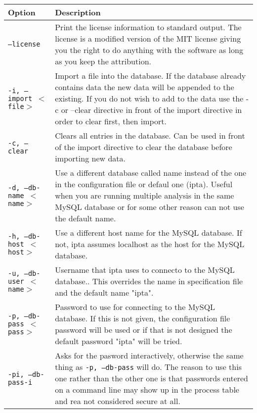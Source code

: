 \documentclass[english,twoside,openright,a4paper,12pt]{article}
\begin{document}
\begin{longtable}{|p{}|p{}|}
\hline
\textbf{Option}& \textbf{Description}\\\hline

\texttt{--license} & Print the license information to standard output. The license is a modified version of the MIT license giving you the right to do anything with the software as long as you keep the attribution.\\ \hline

\texttt{-i, --import $<$file$>$} & Import a file into the database. If the database already contains data the new data will be appended to the existing. If you do not wish to add to the data use the -c or --clear directive in front of the import directive in order to clear first, then import.\\\hline

\texttt{-c, --clear} & Clears all entries in the database. Can be used in front of the import directive to clear the database before importing new data.\\\hline

\texttt{-d, --db-name $<$name$>$} & Use a different database called name instead of the one in the configuration file or defaul one (ipta). Useful when you are running multiple analysis in the same MySQL database or for some other reason can not use the default name.\\\hline

\texttt{-h, --db-host $<$host$>$} & Use a different host name for the MySQL database. If not, ipta assumes localhost as the host for the MySQL database.\\\hline

\texttt{-u, --db-user $<$name$>$} & Username that ipta uses to connecto to the MySQL database.. This overrides the name in specification file and the default name "ipta". \\\hline

\texttt{-p, --db-pass $<$pass$>$} & Password to use for connecting to the MySQL database. If this is not given, the configuration file password will be used or if that is not designed the default password "ipta" will be tried.\\\hline

\texttt{-pi, --db-pass-i} & Asks for the pasword interactively, otherwise the same thing as \texttt{-p, --db-pass} will do. The reason to use this one rather than the other one is that passwords entered on a command line may show up in the process table and rea not considered secure at all.\\\hline


\end{longtable}
\end{document}
